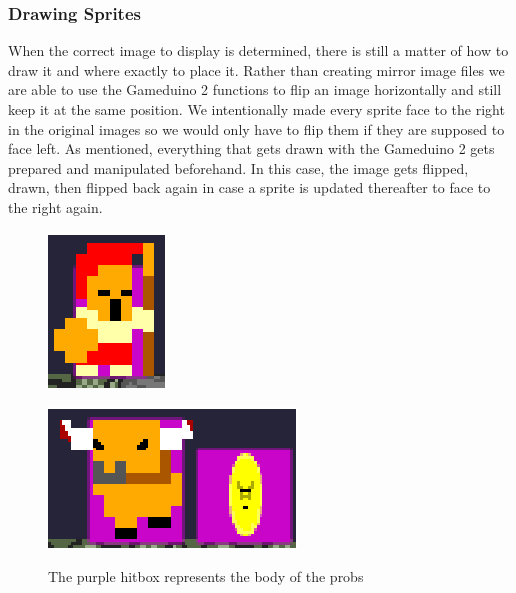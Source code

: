 \subsubsection*{Drawing Sprites}
When the correct image to display is determined, there is still a matter of how to draw it and where exactly to place it. Rather than creating mirror image files we are able to use the Gameduino 2 functions to flip an image horizontally and still keep it at the same position. We intentionally made every sprite face to the right in the original images so we would only have to flip them if they are supposed to face left. As mentioned, everything that gets drawn with the Gameduino 2 gets prepared and manipulated beforehand. In this case, the image gets flipped, drawn, then flipped back again in case a sprite is updated thereafter to face to the right again. \newline


\begin{figure}[ht]
\begin{minipage}[b]{0.47\linewidth}
  \centering
  \includegraphics[scale=0.5]{Figures/herohitbox}
  \label{fig:herohitbox}
\end{minipage}
\hspace{0.5cm}
\begin{minipage}[b]{0.4\linewidth}
  \includegraphics[scale=0.5]{Figures/minocoinhitbox}
  \label{fig:minocoinhitbox}
\end{minipage}
  \caption{The purple hitbox represents the body of the probs}
\end{figure}



